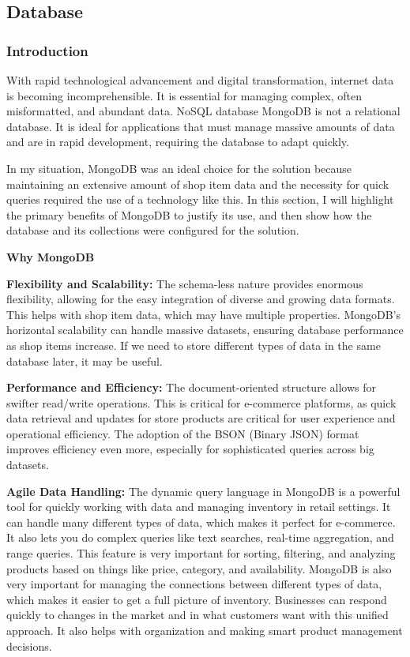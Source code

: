 \subsection{Database}

\subsubsection{Introduction}

With rapid technological advancement and digital transformation, internet data is becoming incomprehensible. It is essential for managing complex, often misformatted, and abundant data. NoSQL database MongoDB is not a relational database. It is ideal for applications that must manage massive amounts of data and are in rapid development, requiring the database to adapt quickly. 

In my situation, MongoDB was an ideal choice for the solution because maintaining an extensive amount of shop item data and the necessity for quick queries required the use of a technology like this. In this section, I will highlight the primary benefits of MongoDB to justify its use, and then show how the database and its collections were configured for the solution.

\noindent\textbf{Why MongoDB}

\textbf{Flexibility and Scalability:} The schema-less nature provides enormous flexibility, allowing for the easy integration of diverse and growing data formats. This helps with shop item data, which may have multiple properties. MongoDB's horizontal scalability can handle massive datasets, ensuring database performance as shop items increase. If we need to store different types of data in the same database later, it may be useful.

\textbf{Performance and Efficiency:} The document-oriented structure allows for swifter read/write operations. This is critical for e-commerce platforms, as quick data retrieval and updates for store products are critical for user experience and operational efficiency. The adoption of the BSON (Binary JSON) format improves efficiency even more, especially for sophisticated queries across big datasets.

\textbf{Agile Data Handling:} The dynamic query language in MongoDB is a powerful tool for quickly working with data and managing inventory in retail settings. It can handle many different types of data, which makes it perfect for e-commerce. It also lets you do complex queries like text searches, real-time aggregation, and range queries. This feature is very important for sorting, filtering, and analyzing products based on things like price, category, and availability. MongoDB is also very important for managing the connections between different types of data, which makes it easier to get a full picture of inventory. Businesses can respond quickly to changes in the market and in what customers want with this unified approach. It also helps with organization and making smart product management decisions.

